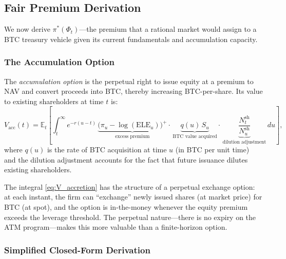 \subsection{Fair Premium Derivation}\label{subsec:fair_premium}

We now derive $\pi^*(\Phi_t)$---the premium that a rational market would
assign to a BTC treasury vehicle given its current fundamentals and
accumulation capacity.

\subsubsection{The Accumulation Option}

\begin{definition}\label{def:accum_option}
The \emph{accumulation option} is the perpetual right to issue equity at a
premium to NAV and convert proceeds into BTC, thereby increasing BTC-per-share.
Its value to existing shareholders at time $t$ is:
\begin{equation}\label{eq:V_accretion}
  V_{\mathrm{acc}}(t) = \mathbb{E}_t\!\left[
    \int_t^\infty e^{-r(u-t)}\,
    \underbrace{\bigl(\pi_u - \log(\mathrm{ELE}_u)\bigr)^+}_{\text{excess premium}}
    \cdot\, \underbrace{q(u)\, S_u}_{\text{BTC value acquired}}
    \cdot\, \underbrace{\frac{N_t^{\mathrm{sh}}}{N_u^{\mathrm{sh}}}
    }_{\text{dilution adjustment}}\,
    du
  \right],
\end{equation}
where $q(u)$ is the rate of BTC acquisition at time $u$ (in BTC per unit time)
and the dilution adjustment accounts for the fact that future issuance dilutes
existing shareholders.
\end{definition}

\begin{remark}
The integral \eqref{eq:V_accretion} has the structure of a perpetual
exchange option: at each instant, the firm can ``exchange'' newly issued
shares (at market price) for BTC (at spot), and the option is in-the-money
whenever the equity premium exceeds the leverage threshold.  The perpetual
nature---there is no expiry on the ATM program---makes this more valuable
than a finite-horizon option.
\end{remark}

\subsubsection{Simplified Closed-Form Derivation}

